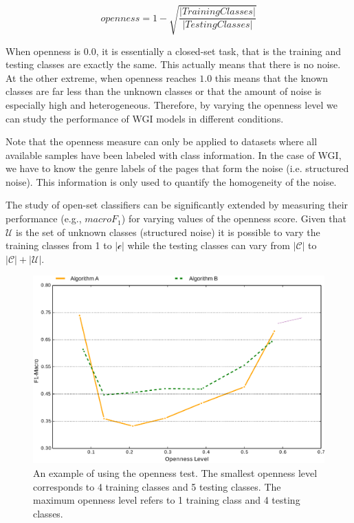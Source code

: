 \begin{equation}\label{chap:eval_methods:eq:openness}
	openness=1-\sqrt{\frac{ | Training Classes | }{ |Testing Classes | }}
\end{equation}

When openness is $0.0$, it is essentially a closed-set task, that is the training and testing classes are exactly the same. This actually means that there is no noise. At the other extreme, when openness reaches $1.0$ this means that the known classes are far less than the unknown classes or that the amount of noise is especially high and heterogeneous. Therefore, by varying the openness level we can study the performance of WGI models in different conditions.

Note that the openness measure can only be applied to datasets where all available samples have been labeled with class information. In the case of WGI, we have to know the genre labels of the pages that form the noise (i.e. structured noise). This information is only used to quantify the homogeneity of the noise.

The study of open-set classifiers can be significantly extended by measuring their performance (e.g., $macro F_{1}$) for varying values of the openness score. Given that $\mathcal{U}$ is the set of unknown classes (structured noise) it is possible to vary the training classes from 1 to $|\mathcal{c}|$ while the testing classes can vary from $|\mathcal{C}|$ to $|\mathcal{C}|+|\mathcal{U}|$. 

\begin{figure}[t]
	\begin{center}
    	\includegraphics[scale=0.50]{Figures/openness_test_for_f1_scores_example.eps}
		\caption{An example of using the openness test. The smallest openness level corresponds to 4 training classes and 5 testing classes. The maximum openness level refers to 1 training class and 4 testing classes.}
		\label{chap:eval_methods:fig:openness}
	\end{center}
\end{figure}


